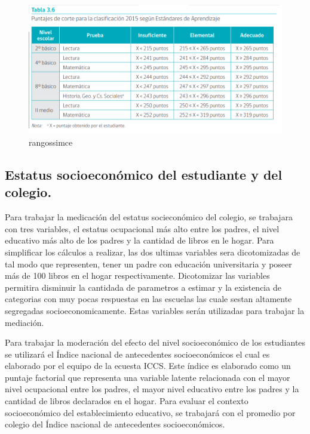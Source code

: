 \documentclass[12pt,twoside]{templates/facsothesis}
\begin{document}
\begin{figure}

{\centering \includegraphics[width=0.8\linewidth]{images/Rangos-puntaje-simce} 

}

\caption{rangossimce}\label{fig:unnamed-chunk-5}
\end{figure}

\hypertarget{estatus-socioeconuxf3mico-del-estudiante-y-del-colegio.}{%
\subsection{Estatus socioeconómico del estudiante y del colegio.}\label{estatus-socioeconuxf3mico-del-estudiante-y-del-colegio.}}

Para trabajar la medicación del estatus socieconómico del colegio, se trabajara con tres variables, el estatus ocupacional más alto entre los padres, el nivel educativo más alto de los padres y la cantidad de libros en le hogar. Para simplificar los cálculos a realizar, las dos ultimas variables sera dicotomizadas de tal modo que representen, tener un padre con educación universitaria y poseer más de 100 libros en el hogar respectivamente. Dicotomizar las variables permitira disminuir la cantidada de parametros a estimar y la existencia de categorias con muy pocas respuestas en las escuelas las cuale sestan altamente segregadas socioeconomicamente. Estas variables serán utilizadas para trabajar la mediación.

Para trabajar la moderación del efecto del nivel socioeconómico de los estudiantes se utilizará el Índice nacional de antecedentes socioeconómicos el cual es elaborado por el equipo de la ecuesta ICCS. Este índice es elaborado como un puntaje factorial que representa una variable latente relacionada con el mayor nivel ocupacional entre los padres, el mayor nivel educativo entre los padres y la cantidad de libros declarados en el hogar. Para evaluar el contexto socioeconómico del establecimiento educativo, se trabajará con el promedio por colegio del Índice nacional de antecedentes socioeconómicos.
\end{document}
